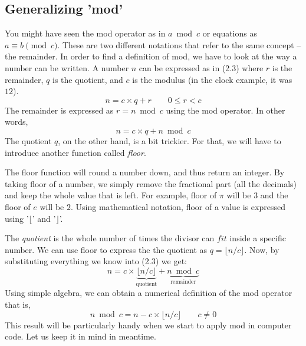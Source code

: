 \subsection{Generalizing 'mod'}
You might have seen the mod operator  as in $a\bmod{c}$ or equations as $a \equiv b  \pmod{c}$. These are two different notations that refer to the same concept -- the remainder. In order to find a definition of mod, we have to look at the way a number can be written. A number $n$ can be expressed as in (2.3) where $r$ is the remainder, $q$ is the quotient, and $c$ is the modulus (in the clock example, it was $12$).
\begin{equation}
n= c\times q + r \qquad 0 \le r < c
\end{equation}
The remainder is expressed as $r=n \bmod{c}$ using the mod operator. In other words, 
\begin{equation*}
n = c\times q +n \bmod{c}
\end{equation*}
The quotient $q$, on the other hand, is a bit trickier. For that, we will have to introduce another function called \textit{floor}.

The floor function will round a number down, and thus return an integer. By taking floor of a number, we simply remove the fractional part (all the decimals) and keep  the whole value that is left. For example, floor of $\pi$ will be $3$ and the floor  of $e$ will be $2$. Using mathematical notation, floor of a value is expressed using '$\lfloor $' and '$ \rfloor$'. 

The \textit{quotient} is the whole number of times the divisor can $fit$ inside a specific number. We can use floor to express the the quotient as $q=\lfloor n/c \rfloor$. Now, by substituting everything we know into (2.3) we get: 
\begin{equation}
n= c\times \underbrace{\lfloor n/c \rfloor}_{\text{quotient}}   + \underbrace{n \bmod c}_{\text{remainder}}
\end{equation}
Using simple algebra, we can obtain a numerical definition of the mod operator that is, 
\begin{equation}
n \bmod c = n- c\times \lfloor n/c \rfloor \qquad c \not =  0
\end{equation}
This result will be particularly handy when we start to apply mod in computer code. Let us keep it in mind in meantime.


